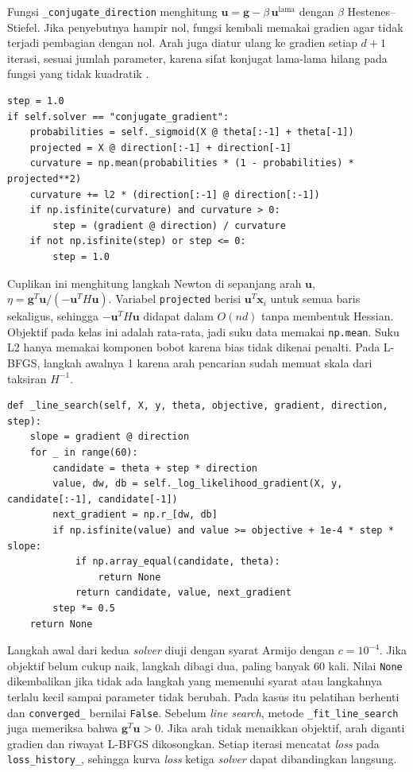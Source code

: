 Fungsi \texttt{\_conjugate\_direction} menghitung
$\mathbf{u}=\mathbf{g}-\beta\,\mathbf{u}^{\mathrm{lama}}$ dengan $\beta$
Hestenes--Stiefel. Jika penyebutnya hampir nol, fungsi kembali memakai gradien
agar tidak terjadi pembagian dengan nol. Arah juga diatur ulang ke gradien
setiap $d+1$ iterasi, sesuai jumlah parameter, karena sifat konjugat lama-lama
hilang pada fungsi yang tidak kuadratik \cite[bab~5]{ref:nocedal-2006}.

\begin{lstlisting}[caption={Langkah awal \textit{conjugate gradient} dari kelengkungan sepanjang arah}, label={lst:cg-step}]
step = 1.0
if self.solver == "conjugate_gradient":
    probabilities = self._sigmoid(X @ theta[:-1] + theta[-1])
    projected = X @ direction[:-1] + direction[-1]
    curvature = np.mean(probabilities * (1 - probabilities) * projected**2)
    curvature += l2 * (direction[:-1] @ direction[:-1])
    if np.isfinite(curvature) and curvature > 0:
        step = (gradient @ direction) / curvature
    if not np.isfinite(step) or step <= 0:
        step = 1.0
\end{lstlisting}

Cuplikan ini menghitung langkah Newton di sepanjang arah $\mathbf{u}$,
$\eta=\mathbf{g}^{T}\mathbf{u}/(-\mathbf{u}^{T}H\mathbf{u})$. Variabel
\texttt{projected} berisi $\mathbf{u}^{T}\mathbf{x}_i$ untuk semua baris
sekaligus, sehingga $-\mathbf{u}^{T}H\mathbf{u}$ didapat dalam $O(nd)$ tanpa
membentuk Hessian. Objektif pada kelas ini adalah rata-rata, jadi suku data
memakai \texttt{np.mean}. Suku L2 hanya memakai komponen bobot karena bias
tidak dikenai penalti. Pada L-BFGS, langkah awalnya 1 karena arah
pencarian sudah memuat skala dari taksiran $H^{-1}$.

\begin{lstlisting}[caption={\textit{Backtracking line search} dengan syarat Armijo}, label={lst:armijo}]
def _line_search(self, X, y, theta, objective, gradient, direction, step):
    slope = gradient @ direction
    for _ in range(60):
        candidate = theta + step * direction
        value, dw, db = self._log_likelihood_gradient(X, y, candidate[:-1], candidate[-1])
        next_gradient = np.r_[dw, db]
        if np.isfinite(value) and value >= objective + 1e-4 * step * slope:
            if np.array_equal(candidate, theta):
                return None
            return candidate, value, next_gradient
        step *= 0.5
    return None
\end{lstlisting}

Langkah awal dari kedua \textit{solver} diuji dengan syarat Armijo dengan
$c=10^{-4}$. Jika objektif belum cukup naik, langkah dibagi dua, paling banyak
60 kali. Nilai \texttt{None} dikembalikan jika tidak ada langkah yang memenuhi
syarat atau langkahnya terlalu kecil sampai parameter tidak berubah. Pada kasus
itu pelatihan berhenti dan \texttt{converged\_} bernilai \texttt{False}.
Sebelum \textit{line search}, metode \texttt{\_fit\_line\_search} juga
memeriksa bahwa $\mathbf{g}^{T}\mathbf{u}>0$. Jika arah tidak menaikkan
objektif, arah diganti gradien dan riwayat L-BFGS dikosongkan. Setiap iterasi
mencatat \textit{loss} pada \texttt{loss\_history\_}, sehingga kurva
\textit{loss} ketiga \textit{solver} dapat dibandingkan langsung.

